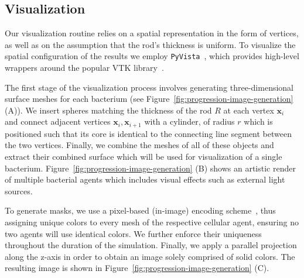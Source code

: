 \documentclass[10pt,letterpaper]{article}
\renewcommand{\vec}[1]{\mathbf{#1}}
\begin{document}
\subsection{Visualization}
\label{subsection:visualization}
Our visualization routine relies on a spatial representation in the form of vertices, as well as on
the assumption that the rod's thickness is uniform.
To visualize the spatial configuration of the results we employ
\texttt{PyVista}~\cite{sullivan2019pyvista}, which provides high-level wrappers around the popular
VTK library~\cite{vtkBook,Sullivan2019}.

The first stage of the visualization process involves generating three-dimensional surface meshes
for each bacterium (see Figure~\ref{fig:progression-image-generation} (A)).
We insert spheres matching the thickness of the rod $R$ at each vertex $\vec{x}_i$ and connect
adjacent vertices $\vec{x}_i,\vec{x}_{i+1}$ with a cylinder, of radius $r$ which is positioned
such that its core is identical to the connecting line segment between the two vertices.
Finally, we combine the meshes of all of these objects and extract their combined surface which will
be used for visualization of a single bacterium.
Figure~\ref{fig:progression-image-generation} (B) shows an artistic render of multiple bacterial
agents which includes visual effects such as external light sources.

To generate masks, we use a pixel-based (in-image) encoding scheme~\cite{JianboShi2000}, thus
assigning unique colors to every mesh of the respective cellular agent, ensuring no two agents
will use identical colors.
We further enforce their uniqueness throughout the duration of the simulation.
Finally, we apply a parallel projection along the z-axis in order to obtain an image solely comprised
of solid colors.
The resulting image is shown in Figure~\ref{fig:progression-image-generation} (C).
\end{document}
